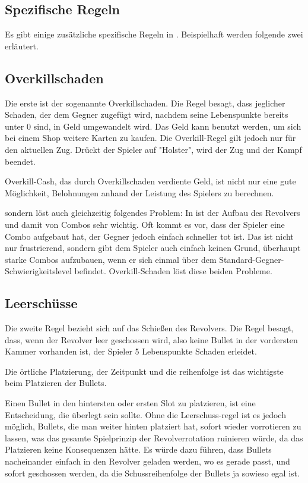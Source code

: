 \subsection{Spezifische Regeln}\label{spezifische_regeln}

Es gibt einige zusätzliche spezifische Regeln in \FF. Beispielhaft werden folgende zwei erläutert.

\subsection{Overkillschaden}\label{Overkill}

Die erste ist der sogenannte Overkillschaden.
Die Regel besagt, dass jeglicher Schaden, der dem Gegner zugefügt wird, nachdem seine Lebenspunkte bereits unter 0 sind,
in Geld umgewandelt wird. Das Geld kann benutzt werden, um sich bei einem Shop weitere Karten zu kaufen.
Die Overkill-Regel gilt jedoch nur für den aktuellen Zug. Drückt der Spieler auf "Holster", wird der Zug und der Kampf beendet.


Overkill-Cash, das durch Overkillschaden verdiente Geld, ist nicht nur eine gute Möglichkeit, Belohnungen anhand der Leistung des Spielers zu berechnen.


sondern löst auch gleichzeitig folgendes Problem: In \FF ist der Aufbau des Revolvers und damit von Combos sehr wichtig.
Oft kommt es vor, dass der Spieler eine Combo aufgebaut hat, der Gegner jedoch einfach schneller tot ist.
Das ist nicht nur frustrierend, sondern gibt dem Spieler auch einfach keinen Grund, überhaupt starke Combos aufzubauen,
wenn er sich einmal über dem Standard-Gegner-Schwierigkeitslevel befindet. Overkill-Schaden löst diese beiden Probleme.


\subsection{Leerschüsse}\label{leerschüsse}

Die zweite Regel bezieht sich auf das Schießen des Revolvers.
Die Regel besagt, dass, wenn der Revolver leer geschossen wird, also keine Bullet in der vordersten Kammer vorhanden ist,
der Spieler 5 Lebenspunkte Schaden erleidet.

Die örtliche Platzierung, der Zeitpunkt und die reihenfolge ist das wichtigste beim Platzieren der Bullets.

Einen Bullet in den hintersten oder ersten Slot zu platzieren, ist eine Entscheidung, die überlegt sein sollte.
Ohne die Leerschuss-regel ist es jedoch möglich, Bullets, die man weiter hinten platziert hat, sofort wieder vorrotieren zu lassen,
was das gesamte Spielprinzip der Revolverrotation ruinieren würde, da das Platzieren keine Konsequenzen hätte.
Es würde dazu führen, dass Bullets nacheinander einfach in den Revolver geladen werden, wo es gerade passt, und sofort
geschossen werden, da die Schussreihenfolge der Bullets ja sowieso egal ist.


